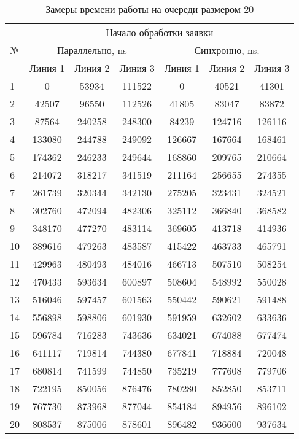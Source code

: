 \begin{table}[H]
	\centering
	\captionsetup{singlelinecheck = false, justification=raggedleft}
	\renewcommand{\arraystretch}{1.3}
	\caption{Замеры времени работы на очереди размером 20}
	\begin{tabular}{||l|c|c|c|c|c|c||}
		\hline
		\multirow{3}{*}{№} & \multicolumn{6}{c||}{Начало обработки заявки} \\ \cline{2-7} 
		& \multicolumn{3}{c|}{Параллельно, ns} & \multicolumn{3}{c||}{Синхронно, ns.} \\ \cline{2-7} 
		& Линия 1 & Линия 2 & Линия 3 & Линия 1 & Линия 2 & Линия 3 \\ \hline
		1   & 0          & 53934      & 111522     & 0          & 40521      & 41301      \\
		2   & 42507      & 96550      & 112526     & 41805      & 83047      & 83872      \\
		3   & 87564      & 240258     & 248300     & 84239      & 124716     & 126116     \\
		4   & 133080     & 244788     & 249092     & 126667     & 167664     & 168461     \\
		5   & 174362     & 246233     & 249644     & 168860     & 209765     & 210664     \\
		6   & 214072     & 318217     & 341519     & 211164     & 256655     & 274355     \\
		7   & 261739     & 320344     & 342130     & 275205     & 323431     & 324521     \\
		8   & 302760     & 472094     & 482306     & 325112     & 366840     & 368582     \\
		9   & 348170     & 477270     & 483114     & 369605     & 413718     & 414936     \\
		10  & 389616     & 479263     & 483587     & 415422     & 463733     & 465791     \\
		11  & 429963     & 480493     & 484016     & 466713     & 507510     & 508254     \\
		12  & 470433     & 593634     & 600897     & 508604     & 548992     & 550028     \\
		13  & 516046     & 597457     & 601563     & 550442     & 590621     & 591488     \\
		14  & 556898     & 598806     & 601930     & 591959     & 632602     & 633636     \\
		15  & 596784     & 716283     & 743636     & 634021     & 674088     & 677474     \\
		16  & 641117     & 719814     & 744380     & 677841     & 718884     & 720048     \\
		17  & 680814     & 741599     & 744850     & 735219     & 777608     & 779706     \\
		18  & 722195     & 850056     & 876476     & 780280     & 852850     & 853711     \\
		19  & 767730     & 873968     & 877044     & 854184     & 894956     & 896102     \\
		20  & 808537     & 875006     & 878601     & 896482     & 936600     & 937634     \\ \hline
	\end{tabular}
	\label{tab:time-gen}
\end{table}
